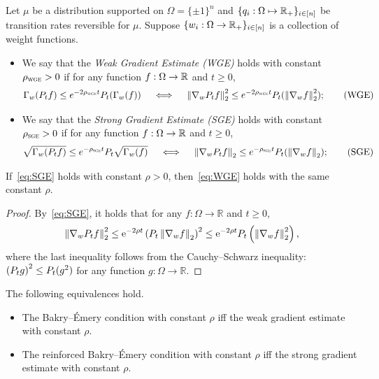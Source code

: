 \begin{definition}
    Let $\mu$ be a distribution supported on $\Omega = \{\pm 1\}^n$ and $\{q_i: \Omega \mapsto \mathbb{R}_+\}_{i\in[n]}$ be transition rates reversible for $\mu$.
    Suppose $\{w_i:\Omega \to \mathbb{R}_+\}_{i\in[n]}$ is a collection of weight functions. 
    \begin{itemize}
        \item We say that the \emph{Weak Gradient Estimate (WGE)} holds with constant $\rho_{{\normalfont\textsc{wge}}} > 0$ if for any function $f:\Omega \to \mathbb{R}$ and $t\geq 0$, 
        \begin{align}\label{eq:WGE}
            \Gamma_w(P_t f) \leq e^{-2\rho_{{\normalfont\textsc{wge}}} t} P_t(\Gamma_w(f)) \quad\iff\quad \left\lVert \nabla_w P_t f \right\rVert^2_2 \leq e^{-2\rho_{{\normalfont\textsc{wge}}} t} P_t(\left\lVert \nabla_w f \right\rVert^2_2); \tag{WGE}
        \end{align}
        \item We say that the \emph{Strong Gradient Estimate (SGE)} holds with constant $\rho_{{\normalfont\textsc{sge}}} > 0$ if for any function $f: \Omega \to \mathbb{R}$ and $t\geq 0$, 
        \begin{align}\label{eq:SGE}
            \sqrt{\Gamma_w(P_t f)} \leq e^{-\rho_{{\normalfont\textsc{sge}}} t} P_t  \sqrt{\Gamma_w(f)} \quad\iff\quad \left\lVert \nabla_w P_t f \right\rVert_2 \leq e^{-\rho_{{\normalfont\textsc{sge}}} t} P_t(\left\lVert \nabla_w f \right\rVert_2); \tag{SGE}
        \end{align}
    \end{itemize}
\end{definition}

\begin{fact}\label{fact:SGE-to-WGE}
If~\ref{eq:SGE} holds with constant $\rho > 0$, then~\ref{eq:WGE} holds with the same constant $\rho$.
\end{fact}

\begin{proof}
    By~\ref{eq:SGE}, it holds that for any $f : \Omega \to \mathbb{R}$ and $t \ge 0$,
    \begin{align*}
         \left\lVert \nabla_w P_t f \right\rVert^2_2  \le \mathrm{e}^{-2\rho t} \left(P_t \left\lVert \nabla_w f \right\rVert_2\right)^2 \le \mathrm{e}^{-2\rho t}P_t \left(\left\lVert \nabla_w f \right\rVert^2_2\right),
    \end{align*}
    where the last inequality follows from the Cauchy--Schwarz inequality: $\left(P_t g\right)^2 \le P_t (g^2)$ for any function $g : \Omega \to \mathbb{R}$.
\end{proof}


\begin{proposition}\label{prop:equivalence_BE_GE}
    The following equivalences hold.
    \begin{itemize}
        \item The Bakry--\'Emery condition with constant $\rho$ iff the weak gradient estimate with constant $\rho$.
        \item The reinforced Bakry--\'Emery condition with constant $\rho$ iff the strong gradient estimate with constant $\rho$.
    \end{itemize}
\end{proposition}

